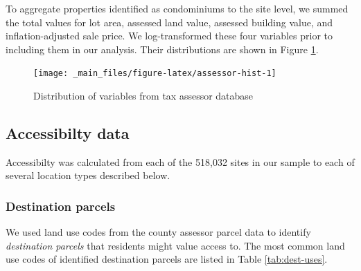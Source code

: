 \documentclass[
]{book}
\begin{document}
To aggregate properties identified as condominiums to the site level, we summed
the total values for lot area, assessed land value, assessed building value, and
inflation-adjusted sale price. We log-transformed these four variables prior to
including them in our analysis. Their distributions are shown in
Figure \ref{fig:assessor-hist}.

\begin{figure}
\texttt{[image: \_main\_files/figure-latex/assessor-hist-1]} \caption{Distribution of variables from tax assessor database}\label{fig:assessor-hist}
\end{figure}

\hypertarget{accessibilty-data}{%
\subsection{Accessibilty data}\label{accessibilty-data}}

Accessibilty was calculated from each of the 518,032 sites in our sample to
each of several location types described below.

\hypertarget{destination-parcels}{%
\subsubsection{Destination parcels}\label{destination-parcels}}

We used land use codes from the county assessor parcel data to identify
\emph{destination parcels} that residents might value access to. The most common
land use codes of identified destination parcels are listed in Table \ref{tab:dest-uses}.
\end{document}
